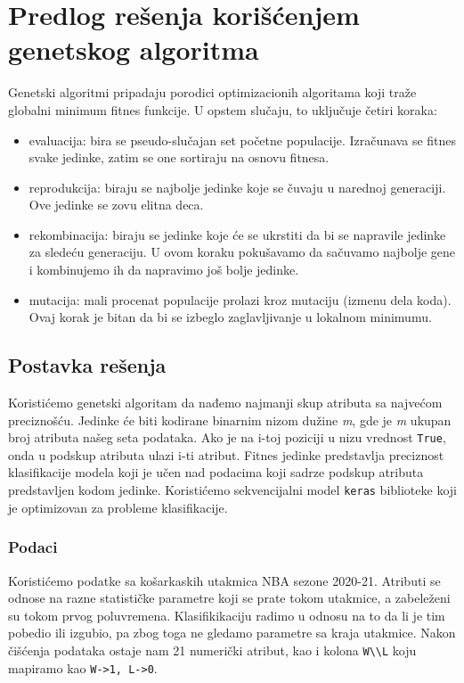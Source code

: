 \documentclass[11pt]{article} %
\begin{document}
\section{Predlog rešenja korišćenjem genetskog algoritma}
Genetski algoritmi pripadaju porodici optimizacionih algoritama koji traže globalni minimum fitnes funkcije. U opstem slučaju, to uključuje četiri koraka: \cite{Cui}
\begin{itemize}
\item evaluacija: bira se pseudo-slučajan set početne populacije. Izračunava se fitnes svake jedinke, zatim se one sortiraju na osnovu fitnesa.
\item reprodukcija: biraju se najbolje jedinke koje se čuvaju u narednoj generaciji. Ove jedinke se zovu elitna deca.
\item rekombinacija: biraju se jedinke koje će se ukrstiti da bi se napravile jedinke za sledeću generaciju. U ovom koraku pokušavamo da sačuvamo najbolje gene i kombinujemo ih da napravimo još bolje jedinke.
\item mutacija: mali procenat populacije prolazi kroz mutaciju (izmenu dela koda). Ovaj korak je bitan da bi se izbeglo zaglavljivanje u lokalnom minimumu.
\end{itemize}

\subsection{Postavka rešenja}
Koristićemo genetski algoritam da nađemo najmanji skup atributa sa najvećom preciznošću. Jedinke će biti kodirane binarnim nizom dužine \textit{m}, gde je \textit{m} ukupan broj atributa našeg seta podataka. Ako je na i-toj poziciji u nizu vrednost \lstinline{True}, onda u podskup atributa ulazi i-ti atribut. Fitnes jedinke predstavlja preciznost klasifikacije modela koji je učen nad podacima koji sadrze podskup atributa predstavljen kodom jedinke. Koristićemo sekvencijalni model \lstinline{keras} biblioteke koji je optimizovan za probleme klasifikacije.
\subsubsection{Podaci}
Koristićemo podatke sa košarkaskih utakmica NBA sezone 2020-21. Atributi se odnose na razne statističke parametre koji se prate tokom utakmice, a zabeleženi su tokom prvog poluvremena. Klasifikikaciju radimo u odnosu na to da li je tim pobedio ili izgubio, pa zbog toga ne gledamo parametre sa kraja utakmice. Nakon čišćenja podataka ostaje nam 21 numerički atribut, kao i kolona \lstinline{W\\L} koju mapiramo kao \lstinline{W->1, L->0}. \newline
\end{document}
